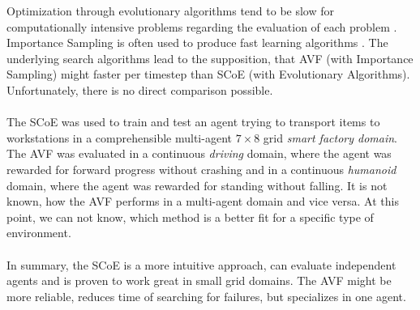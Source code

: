 Optimization through evolutionary algorithms tend to be slow for computationally intensive problems regarding the evaluation of each problem \cite{cruz}. Importance Sampling is often used to produce fast learning algorithms \cite{chen18, schaal04}. The underlying search algorithms lead to the supposition, that AVF (with Importance Sampling) might faster per timestep than SCoE (with Evolutionary Algorithms). Unfortunately, there is no direct comparison possible.\\\\
The SCoE was used to train and test an agent trying to transport items to workstations in a comprehensible multi-agent $7 \times 8$ grid \textit{smart factory domain}. The AVF was evaluated in a continuous \textit{driving} domain, where the agent was rewarded for forward progress without crashing and in a continuous \textit{humanoid} domain, where the agent was rewarded for standing without falling. It is not known, how the AVF performs in a multi-agent domain and vice versa. At this point, we can not know, which method is a better fit for a specific type of environment.\\\\
In summary, the SCoE is a more intuitive approach, can evaluate independent agents and is proven to work great in small grid domains. The AVF might be more reliable, reduces time of searching for failures, but specializes in one agent.